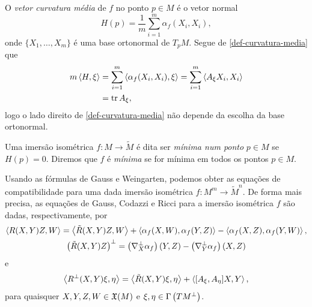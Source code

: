\begin{definicao}
	O \emph{vetor curvatura média} de $f$ no ponto $p \in M$ é o vetor normal
	\begin{equation}\label{def-curvatura-media}
		H(p) = \frac{1}{m} \sum_{i=1}^{m} \alpha_f (X_i, X_i),
	\end{equation}
	onde $\{ X_1, \ldots, X_m \}$ é uma base ortonormal de $T_p M$. Segue de \eqref{def-curvatura-media} que
	\begin{align*}
		m \left\langle H,\xi \right\rangle &= \sum_{i=1}^{m} \left\langle \alpha_f (X_i, X_i),\xi \right\rangle = \sum_{i=1}^{m} \left\langle A_\xi X_i,X_i \right\rangle\\
		&= \operatorname{tr} A_\xi,
	\end{align*}
	logo o lado direito de \eqref{def-curvatura-media} não depende da escolha da base ortonormal.
\end{definicao}

\begin{definicao}
	Uma imersão isométrica $f: M \rightarrow \tilde{M}$ é dita ser \emph{mínima num ponto} $p \in M$ se $H(p)=0$. Diremos que $f$ é \emph{mínima} se for mínima em todos os pontos $p \in M$.
\end{definicao}

Usando as fórmulas de Gauss e Weingarten, podemos obter as equações de compatibilidade para uma dada imersão isométrica $f: M^m \rightarrow \tilde{M}^n$. De forma mais precisa, as equações de Gauss, Codazzi e Ricci para a imersão isométrica $f$ são dadas, respectivamente, por
\begin{gather}\label{eq-gauss}
	\left\langle R(X,Y)Z,W \right\rangle = \left\langle \tilde{R}(X,Y)Z,W \right\rangle + \left\langle \alpha_f (X,W),\alpha_f(Y,Z) \right\rangle - \left\langle \alpha_f (X,Z),\alpha_f (Y,W) \right\rangle,\\
	\label{eq-codazzi}
	\left( \tilde{R}(X,Y)Z \right)^\perp = \left( \nabla^\perp_X \alpha_f \right)(Y,Z) - \left( \nabla^\perp_Y \alpha_f \right)(X,Z)
\end{gather}
e
\begin{equation}\label{eq-ricci}
	\left\langle R^\perp (X,Y) \xi,\eta \right\rangle = \left\langle \tilde{R}(X,Y) \xi,\eta \right\rangle + \left\langle [A_\xi, A_\eta] X,Y \right\rangle,
\end{equation}
para quaisquer $X,Y,Z,W \in \mathfrak{X}(M)$ e $\xi, \eta \in \Gamma \left( TM^\perp \right)$.

